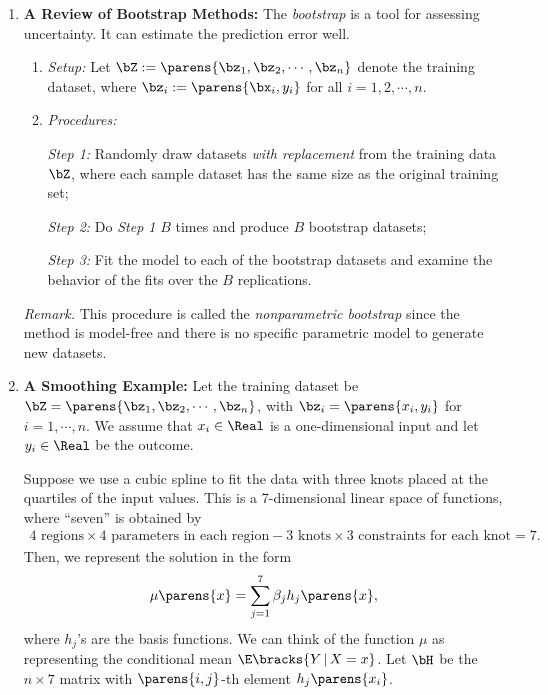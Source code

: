 \documentclass[12pt]{article}
\begin{document}
\begin{enumerate}[label=\textbf{\arabic*.}]

	\item \textbf{A Review of Bootstrap Methods:} The \textit{bootstrap} is a tool for assessing uncertainty. It can estimate the prediction error well. 
	
	\begin{enumerate}
		\item \textit{Setup:} Let $\bZ := \parens{\bz_1, \bz_2, \cdots, \bz_n}$ denote the training dataset, where $\bz_i := \parens{\bx_i, y_i}$ for all $i = 1, 2, \cdots, n$. 
		
		\item \textit{Procedures:} 
		
		\textit{Step 1:} Randomly draw datasets \textit{with replacement} from the training data $\bZ$, where each sample dataset has the same size as the original training set; 
		
		\textit{Step 2:} Do \textit{Step 1} $B$ times and produce $B$ bootstrap datasets; 
		
		\textit{Step 3:} Fit the model to each of the bootstrap datasets and examine the behavior of the fits over the $B$ replications. 
	\end{enumerate}
	
	\textit{Remark.} This procedure is called the \textit{nonparametric bootstrap} since the method is model-free and there is no specific parametric model to generate new datasets. 

	\item \textbf{A Smoothing Example:} Let the training dataset be $\bZ = \parens{\bz_1, \bz_2, \cdots, \bz_n}$, with $\bz_i = \parens{x_i, y_i}$ for $i = 1, \cdots, n$. We assume that $x_i \in \Real$ is a one-dimensional input and let $y_i \in \Real$ be the outcome. 
	
	Suppose we use a cubic spline to fit the data with three knots placed at the quartiles of the input values. This is a 7-dimensional linear space of functions, where ``seven'' is obtained by 
	\begin{align*}
		4 \text{ regions} \times 4 \text{ parameters in each region} - 3 \text{ knots} \times 3 \text{ constraints for each knot} = 7. 
	\end{align*}
	Then, we represent the solution in the form
	\begin{align}
		\mu \parens{x} = \sum_{j=1}^7 \beta_j h_j \parens{x}, 
	\end{align}
	where $h_j$'s are the basis functions. We can think of the function $\mu$ as representing the conditional mean $\E \bracks{Y \,\vert\, X = x}$. Let $\bH$ be the $n \times 7$ matrix with $\parens{i, j}$-th element $h_j \parens{x_i}$. 
	

\end{enumerate}
\end{document}
